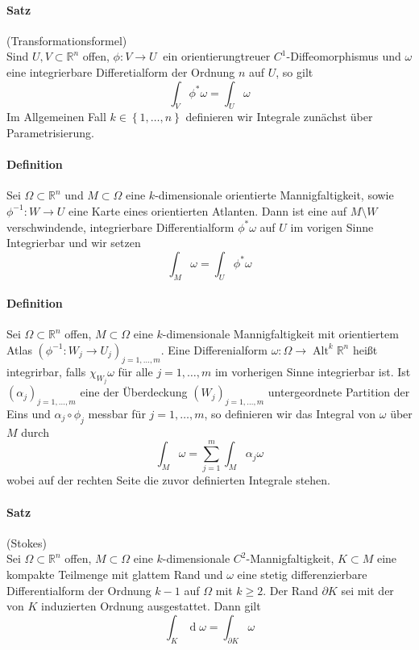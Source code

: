 \documentclass[12pt,a4paper,fleqn]{article}
\def\set#1{{\left\{ #1 \right\}}}
\def\R{{\mathbb{R}}}
\def\d{{\operatorname{d}}}
\begin{document}
\paragraph{Satz} (Transformationsformel)\\
Sind $U, V\subset \R^n$ offen, $\phi\colon V \rightarrow U\ $ ein orientierungtreuer $C^1$-Diffeomorphismus und $\omega$ eine integrierbare Differetialform der Ordnung $n$ auf $U$, so gilt
\begin{displaymath}
\int_V \phi^\ast\omega = \int_U \omega
\end{displaymath}
Im Allgemeinen Fall $k \in \set{1, \dots, n}$ definieren wir Integrale zunächst über Parametrisierung.

\paragraph{Definition} Sei $\Omega\subset\R^n$ und $M\subset\Omega$ eine $k$-dimensionale orientierte Mannigfaltigkeit, sowie $\phi^{-1}\colon W \rightarrow U$ eine Karte eines orientierten Atlanten. Dann ist eine auf $M\setminus W$ verschwindende, integrierbare Differentialform $\phi^\ast\omega$ auf $U$ im vorigen Sinne Integrierbar und wir setzen
\begin{displaymath}
\int_M \omega = \int_U \phi^\ast\omega
\end{displaymath}

\paragraph{Definition} Sei $\Omega\subset\R^n$ offen, $M\subset\Omega$ eine $k$-dimensionale Mannigfaltigkeit mit orientiertem Atlas $(\phi^{-1}\colon W_j \rightarrow U_j)_{j = 1, \dots, m}$. Eine Differenialform $\omega\colon \Omega \rightarrow\operatorname{Alt}^k \R^n$ heißt integrirbar, falls $\chi_{W_j}\omega$ für alle $j=1, \dots, m$ im vorherigen Sinne integrierbar ist. Ist $(\alpha_j)_{j=1, \dots, m}$ eine der Überdeckung $(W_j)_{j=1, \dots, m}$ untergeordnete Partition der Eins und $\alpha_j\circ\phi_j$ messbar für $j=1, \dots, m$, so definieren wir das Integral von $\omega$ über $M$ durch
\begin{displaymath}
\int_M \omega = \sum_{j=1}^m \int_M \alpha_j\omega
\end{displaymath}
wobei auf der rechten Seite die zuvor definierten Integrale stehen.

\paragraph{Satz} (Stokes)\\
Sei $\Omega\subset\R^n$ offen, $M\subset\Omega$ eine $k$-dimensionale $C^2$-Mannigfaltigkeit, $K\subset M$ eine kompakte Teilmenge mit glattem Rand und $\omega$ eine stetig differenzierbare Differentialform der Ordnung $k-1$ auf $\Omega$ mit $k\geq 2$. Der Rand $\partial K$ sei mit der von $K$ induzierten Ordnung ausgestattet. Dann gilt
\begin{displaymath}
\int_K \d\omega = \int_{\partial K} \omega
\end{displaymath}
\end{document}
